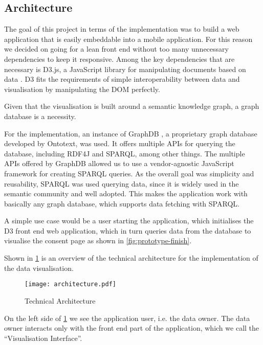 \documentclass[../paper.tex]{subfiles}
\begin{document}
  \subsection{Architecture}

  The goal of this project in terms of the implementation was to
  build a web application that is easily embeddable into a mobile application.
  For this reason we decided on going for a lean front end without too many
  unnecessary dependencies to keep it responsive. Among the key dependencies that
  are necessary is D3.js, a JavaScript library for manipulating documents based
  on data \cite{d3}. D3 fits the requirements of simple interoperability between
  data and visualisation by manipulating the DOM perfectly.

  Given that the
  visualisation is built around a semantic knowledge graph, a graph database is
  a necessity.

  For the implementation, an instance of  GraphDB \cite{graphdb}, a proprietary graph
  database developed by Ontotext, was used. It offers multiple APIs for querying the database,
  including RDF4J and SPARQL, among other things. The multiple APIs offered by
  GraphDB allowed us to use a vendor-agnostic JavaScript framework for
  creating SPARQL queries. As the overall goal was simplicity and reusability,
  SPARQL was used querying data, since it is widely used
  in the semantic community and well adopted. This makes the application work with
  basically any graph database, which supports data fetching with SPARQL.

  A simple use case would be a user starting the application, which initialises
  the D3 front end web application, which in turn queries data from the database
  to visualise the consent page as shown in \cref{fig:prototype-finish}.
  

  Shown in \cref{fig:architecture} is an overview of the technical architecture
  for the implementation of the data visualisation.

  \begin{figure}
    \centering
    \texttt{[image: architecture.pdf]}
    \caption{Technical Architecture}
    \label{fig:architecture}
  \end{figure}

  On the left side of \cref{fig:architecture} we see the application user, i.e.
  the data owner. The data owner interacts only with the front end part of the
  application, which we call the “Visualisation Interface”.
\end{document}
